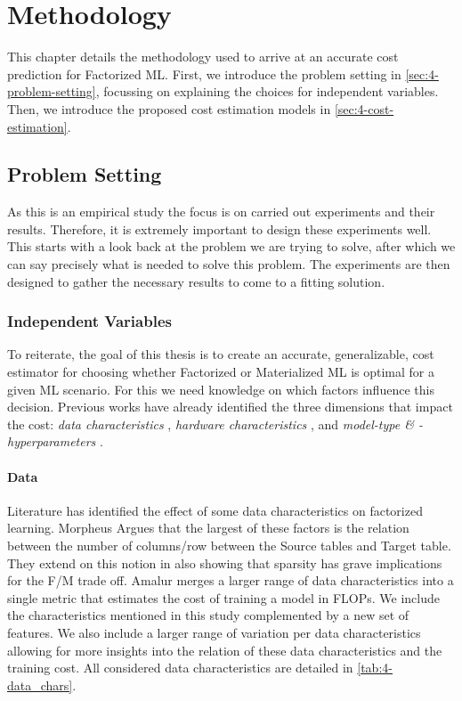 
\chapter{Methodology}

\label{chapter:methodology}

This chapter details the methodology used to arrive at an accurate cost prediction for Factorized ML. First, we introduce the problem setting in \autoref{sec:4-problem-setting}, focussing on explaining the choices for independent variables. Then, we introduce the proposed cost estimation models in \autoref{sec:4-cost-estimation}.

\section{Problem Setting}
\label{sec:4-problem-setting}

As this is an empirical study the focus is on carried out experiments and their results. Therefore, it is extremely important to design these experiments well. This starts with a look back at the problem we are trying to solve, after which we can say precisely what is needed to solve this problem. The experiments are then designed to gather the necessary results to come to a fitting solution.

\subsection{Independent Variables}
To reiterate, the goal of this thesis is to create an accurate, generalizable, cost estimator for choosing whether Factorized or Materialized ML is optimal for a given ML scenario. For this we need knowledge on which factors influence this decision. Previous works have already identified the three dimensions that impact the cost: \emph{data characteristics} \cite{morpheus, amalur,schijndel_cost_estimation}, \emph{hardware characteristics} \cite{orion_learning_gen_lin_models}, and \emph{model-type \& -hyperparameters} \cite{amalur,schijndel_cost_estimation}.

\subsubsection{Data}
Literature has identified the effect of some data characteristics on factorized learning. Morpheus \cite{morpheus} Argues that the largest of these factors is the relation between the number of columns/row between the Source tables and Target table. They extend on this notion in \cite{MorpheusFIEnablingOptimizingNonlinear2019} also showing that sparsity has grave implications for the F/M trade off. Amalur \cite{amalur} merges a larger range of data characteristics into a single metric that estimates the cost of training a model in FLOPs. We include the characteristics mentioned in this study complemented by a new set of features. We also include a larger range of variation per data characteristics allowing for more insights into the relation of these data characteristics and the training cost. All considered data characteristics are detailed in \autoref{tab:4-data_chars}.

